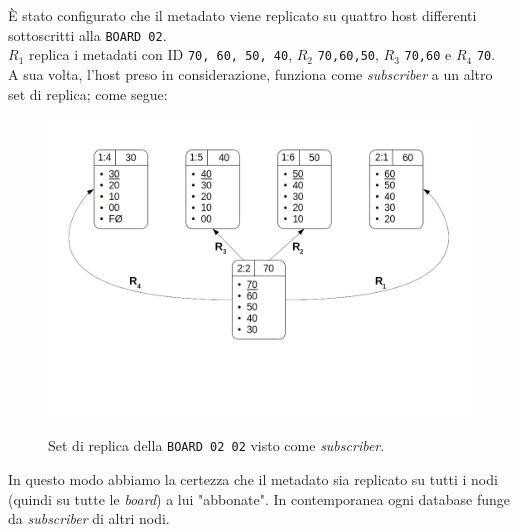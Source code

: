\`{E} stato configurato che il metadato viene replicato su quattro host differenti sottoscritti alla \verb"BOARD 02".\\
$R_1$ replica i metadati con ID \verb"70, 60, 50, 40", $R_2$ \verb"70,60,50", $R_3$ \verb"70,60" e $R_4$ \verb"70".\\
A sua volta, l'host preso in considerazione, funziona come \textit{subscriber} a un altro set di replica; come segue:

\begin{figure}[htbp]
\centering
\includegraphics[scale=0.40]{img/sub_replica.png}\\
\caption{Set di replica della \verb"BOARD 02 02" visto come \textit{subscriber}. \label{figura1.18}}
\end{figure}

In questo modo abbiamo la certezza che il metadato sia replicato su tutti i nodi (quindi su tutte le \textit{board}) a lui "abbonate". In contemporanea ogni database funge da \textit{subscriber} di altri nodi.

